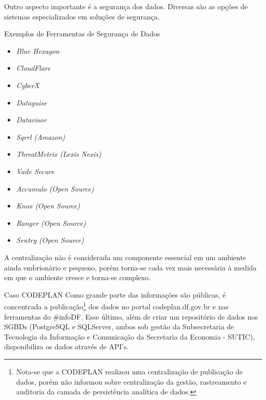     Outro aspecto importante é a segurança dos dados. Diversas são as opções de sistemas especializados em soluções de segurança. 

    \begin{env-sistemas}{Exemplos de Ferramentas de Segurança de Dados}
         \begin{multicols}{2}
            \begin{itemize}
                \item \emph{Blue Hexagon}
                \item \emph{CloudFlare}
                \item \emph{CyberX}
                \item \emph{Dataguise}
                \item \emph{Datavisor}
                \item \emph{Sqrrl (Amazon)}
                \item \emph{ThreatMetrix (Lexis Nexis)}
                \item \emph{Vade Secure}
                \item \emph{Accumulo (Open Source)}
                \item \emph{Knox (Open Source)}
                \item \emph{Ranger (Open Source)}
                \item \emph{Sentry (Open Source)}
            \end{itemize}
        \end{multicols}
    \end{env-sistemas}


    A centralização não é considerada um componente essencial em um ambiente ainda embrionário e pequeno, porém torna-se cada vez mais necessária à medida em que o ambiente cresce e torna-se complexo.

    \begin{env-caso}{Caso CODEPLAN}
        Como grande parte das informações são públicas, é concentrada a publicação\footnote{Nota-se que a CODEPLAN realizou uma centralização de publicação de dados, porém não informou sobre centralização da gestão, rastreamento e auditoria da camada de persistência analítica de dados.} dos dados no portal codeplan.df.gov.br e nas ferramentas do \#infoDF. Esse último, além de criar um repositório de dados nos SGBDs (PostgreSQL e SQLServer, ambos sob gestão da Subsecretaria de Tecnologia da Informação e Comunicação da Secretaria da Economia - SUTIC), disponibiliza os dados através de API's.
    \end{env-caso}

